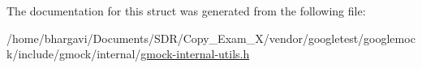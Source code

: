 The documentation for this struct was generated from the following file\+:\begin{DoxyCompactItemize}
\item 
/home/bhargavi/\+Documents/\+S\+D\+R/\+Copy\+\_\+\+Exam\+\_\+X/vendor/googletest/googlemock/include/gmock/internal/\hyperlink{gmock-internal-utils_8h}{gmock-\/internal-\/utils.\+h}\end{DoxyCompactItemize}
